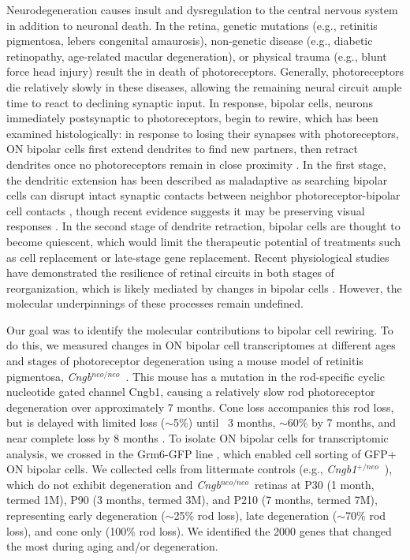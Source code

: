 \documentclass[11pt, a4paper]{article}
\newcommand{\cngb}{\textit{Cngb$^{neo/neo}$}~}
\newcommand{\cngbwt}{\textit{Cngb1$^{+/neo}$}~}
\begin{document}
Neurodegeneration causes insult and dysregulation to the central nervous system in addition to neuronal death. In the retina, genetic mutations (e.g., retinitis pigmentosa, lebers congenital amaurosis), non-genetic disease (e.g., diabetic retinopathy, age-related macular degeneration), or physical trauma (e.g., blunt force head injury) result the in death of photoreceptors. Generally, photoreceptors die relatively slowly in these diseases, allowing the remaining neural circuit ample time to react to declining synaptic input. In response, bipolar cells, neurons immediately postsynaptic to photoreceptors, begin to rewire, which has been examined histologically: in response to losing their synapses with photoreceptors, ON bipolar cells first extend dendrites to find new partners, then retract dendrites once no photoreceptors remain in close proximity \cite{REFS}. In the first stage, the dendritic extension has been described as maladaptive as searching bipolar cells can disrupt intact synaptic contacts between neighbor photoreceptor-bipolar cell contacts \citep{Marc2003,Beier2017,Leinonen2023}, though recent evidence suggests it may be preserving visual responses \citep{Bonezzi2025-xo}. In the second stage of dendrite retraction, bipolar cells are thought to become quiescent, which would limit the therapeutic potential of treatments such as cell replacement or late-stage gene replacement. Recent physiological studies have demonstrated the resilience of retinal circuits in both stages of reorganization, which is likely mediated by changes in bipolar cells \citep{Scalabrino2022-um, Scalabrino2023-dk, Ellis2023-qy}. However, the molecular underpinnings of these processes remain undefined.

Our goal was to identify the molecular contributions to bipolar cell rewiring. To do this, we measured changes in ON bipolar cell transcriptomes at different ages and stages of photoreceptor degeneration using a mouse model of retinitis pigmentosa, \cngb. This mouse has a mutation in the rod-specific cyclic nucleotide gated channel Cngb1, causing a relatively slow rod photoreceptor degeneration over approximately 7 months. Cone loss accompanies this rod loss, but is delayed with limited loss ($\sim$5\%) until ~3 months, $\sim$60\% by 7 months, and near complete loss by 8 months \citep{Scalabrino2022-um}. To isolate ON bipolar cells for transcriptomic analysis, we crossed in the Grm6-GFP line \citep{Dhingra2008}, which enabled cell sorting of GFP+ ON bipolar cells. We collected cells from littermate controls (e.g., \cngbwt), which do not exhibit degeneration and \cngb retinas at P30 (1 month, termed 1M), P90 (3 months, termed 3M), and P210 (7 months, termed 7M), representing early degeneration ($\sim$25$\%$ rod loss), late degeneration ($\sim$70$\%$  rod loss), and cone only (100$\%$  rod loss). We identified the 2000 genes that changed the most during aging and/or degeneration. 
\end{document}
